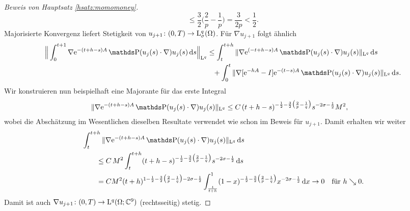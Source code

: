 \begin{proof}[Beweis von Hauptsatz \ref{hsatz:momomoney}]
$$  \leq \frac{3}{2} \big( \frac{2}{p} - \frac{1}{p} \big)
  = \frac{3}{2p} 
  < \frac{1}{2}.
  $$
  Majorisierte Konvergenz liefert Stetigkeit von $u_{j + 1} \colon (0,T) \to \mathrm{L}_\sigma^q(\Omega)$.
  Für $\nabla u_{j + 1}$ folgt ähnlich
  \begin{align*}
    \Big\| \int_0^{t + 1} \nabla \e^{-(t + h - s) A} \PP (u_j(s) \cdot \nabla ) u_j(s) \d s \Big\|_{\Ell^q}
    &\leq \int_t^{t + h} \|\nabla \e^{(-t + h - s) A} \PP(u_j(s) \cdot \nabla ) u_j(s) \|_{\Ell^q} \d s \\ 
    &\hphantom{\leq} + \int_0^t \|\nabla [\e^{-h A} - I ] \e^{-(t - s) A} \PP(u_j(s) \cdot \nabla) u_j(s) \|_{\Ell^q} \d s.
  \end{align*}
  Wir konstruieren nun beispielhaft eine Majorante für das erste Integral
  \begin{align*}
    \|\nabla \e^{-(t + h - s) A} \PP(u_j(s) \cdot \nabla) u_j(s) \|_{\Ell^q} 
    &\leq C\, (t + h - s)^{-\frac{1}{2} - \frac{3}{2} \big( \frac{2}{p} - \frac{1}{q} \big)} s^{-2 \sigma - \frac{1}{2} } M^2,
  \end{align*}
  wobei die Abschätzung im Wesentlichen dieselben Resultate verwendet wie schon im Beweis für $u_{j + 1}$.
  Damit erhalten wir weiter
  \begin{align*}
    &\int_t^{t + h} \|\nabla \e^{-(t + h - s)A} \PP(u_j(s) \cdot \nabla) u_j(s) \|_{\Ell^q} \d s \\
    &\qquad\leq C\, M^2 \int_t^{t + h} (t + h - s)^{-\frac{1}{2} - \frac{3}{2} \big( \frac{2}{p} - \frac{1}{q} \big)} s^{-2\sigma - \frac{1}{2}} \d s \\
    &\qquad= C M^2 (t + h)^{1 - \frac{1}{2} - \frac{3}{2}\big( \frac{2}{p} - \frac{1}{q} \big) - 2\sigma - \frac{1}{2}} \int_{\frac{t}{t + h}}^1 (1 - x)^{-\frac{1}{2} - \frac{3}{2} \big(\frac{2}{p} - \frac{1}{q}\big)} x^{-2\sigma - \frac{1}{2}} \d x \to 0 \quad\text{für } h \searrow 0.
  \end{align*}
  Damit ist auch $\nabla u_{j + 1} \colon (0, T) \to \mathrm{L}^q(\Omega; \mathbb{C}^9)$ (rechtsseitig) stetig.


\end{proof}
